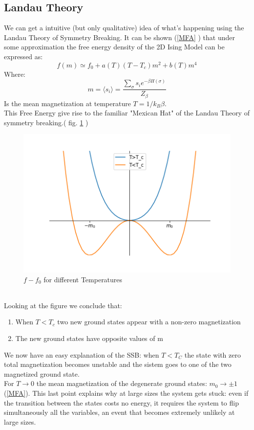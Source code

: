 \documentclass[12pt,a4paper]{article}
\begin{document}
\subsection{Landau Theory}
We can get a intuitive (but only qualitative) idea of what's happening using the Landau Theory of Symmetry Breaking.  
It can be shown (\ref{MFA} ) that under some approximation the free energy density of the 2D Ising Model can be expressed as:
\begin{equation}
	f(m) \simeq f_{0}+a(T)\left(T-T_{c}\right) m^{2}+b(T) m^{4}
\end{equation}
Where:
\begin{equation}
	m=\langle s_i \rangle = \frac{\sum_{\sigma} s_i e^{-\beta H(\sigma)}}{Z_{\beta}}
\end{equation}
Is the mean magnetization at temperature $T=1/k_B\beta$.\\
This Free Energy give rise to the familiar "Mexican Hat" of the Landau Theory of symmetry breaking.( fig. \ref{fig:landau} )\\
\begin{figure}[h!]
	\centering
	\includegraphics[width=0.7\linewidth]{landau}
	\caption{$f-f_0$ for different Temperatures}
	\label{fig:landau}
\end{figure}\\
Looking at the figure we conclude that:
\begin{enumerate}
	\item When $T<T_c$ two new ground states appear with a non-zero magnetization
	\item The new ground states have opposite values of m
\end{enumerate}
We now have an easy explanation of the SSB: when $T<T_C$ the state with zero total magnetization becomes unstable and the sistem goes to one of the two magnetized ground state. \\ For $T \rightarrow 0$ the mean magnetization of the degenerate ground states: $m_0\rightarrow \pm1$ (\ref{MFA}).
This last point explains why at large sizes the system gets stuck: even if the transition between the states costs no energy, it requires the system to flip simultaneously all the variables, an event that becomes extremely unlikely at large sizes.
\end{document}
